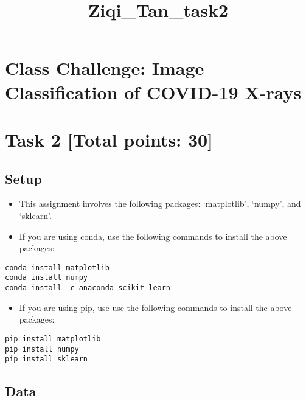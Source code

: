 \documentclass[11pt]{article}
\title{Ziqi\_Tan\_task2}
\providecommand{\tightlist}{%
      \setlength{\itemsep}{0pt}\setlength{\parskip}{0pt}}
\begin{document}
    
    \maketitle
    
    

    
    \hypertarget{class-challenge-image-classification-of-covid-19-x-rays}{%
\section{Class Challenge: Image Classification of COVID-19
X-rays}\label{class-challenge-image-classification-of-covid-19-x-rays}}

\hypertarget{task-2-total-points-30}{%
\section{Task 2 {[}Total points: 30{]}}\label{task-2-total-points-30}}

    \hypertarget{setup}{%
\subsection{Setup}\label{setup}}

\begin{itemize}
\item
  This assignment involves the following packages: `matplotlib',
  `numpy', and `sklearn'.
\item
  If you are using conda, use the following commands to install the
  above packages:
\end{itemize}

\begin{verbatim}
conda install matplotlib
conda install numpy
conda install -c anaconda scikit-learn
\end{verbatim}

\begin{itemize}
\tightlist
\item
  If you are using pip, use use the following commands to install the
  above packages: 
\end{itemize}

\begin{verbatim}
pip install matplotlib
pip install numpy
pip install sklearn
\end{verbatim}

    \hypertarget{data}{%
\subsection{Data}\label{data}}
\end{document}
